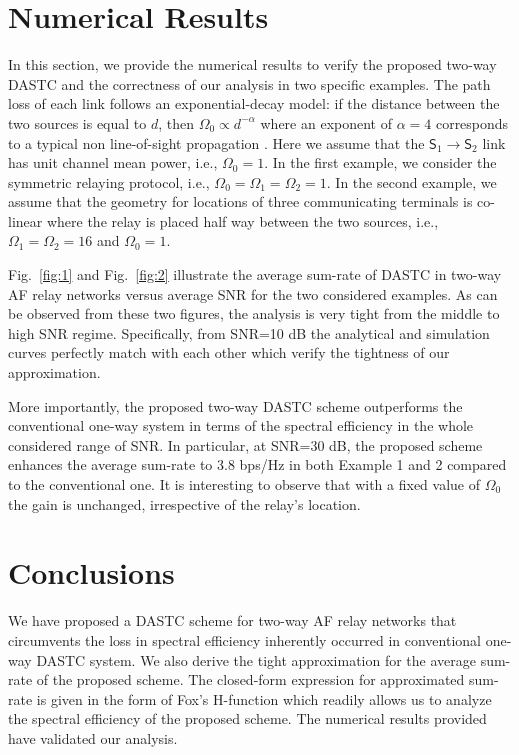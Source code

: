 \documentclass[conference]{IEEEtran}
\newcommand{\Source}[1]{\mathsf{S}_{#1}}
\newcommand{\CP}[1]{\Omega_{#1}}
\begin{document}
\section{Numerical Results} \label{sec:Result}

In this section, we provide the numerical results to verify the
proposed two-way DASTC and the correctness of our analysis in two
specific examples. The path loss of each link follows an
exponential-decay model: if the distance between the two sources is
equal to $d$, then $\CP{0} \propto d^{-\alpha}$ where an exponent of
$\alpha=4$ corresponds to a typical non line-of-sight propagation
\cite{HTHC:08:VTCSpring}. Here we assume that the
$\Source{1}\longrightarrow \Source{2}$ link has unit channel mean
power, i.e., $\CP{0}=1$. In the first example, we consider the
symmetric relaying protocol, i.e., $\CP{0}=\CP{1}=\CP{2}=1$. In the
second example, we assume that the geometry for locations of three
communicating terminals is co-linear where the relay is placed half
way between the two sources, i.e., $\CP{1}=\CP{2}=16$ and
$\CP{0}=1$.

Fig.~\ref{fig:1} and Fig.~\ref{fig:2} illustrate the average
sum-rate of DASTC in two-way AF relay networks versus average SNR
for the two considered examples. As can be observed from these two
figures, the analysis is very tight from the middle to high SNR
regime. Specifically, from SNR=10 dB the analytical and simulation
curves perfectly match with each other which verify the tightness of
our approximation.

More importantly, the proposed two-way DASTC scheme outperforms the
conventional one-way system in terms of the spectral efficiency in
the whole considered range of SNR. In particular, at SNR=30 dB, the
proposed scheme enhances the average sum-rate to 3.8 bps/Hz in both
Example 1 and 2 compared to the conventional one. It is interesting
to observe that with a fixed value of $\CP{0}$ the gain is
unchanged, irrespective of the relay's location.
%
\section{Conclusions} \label{sec:Conclusions}

We have proposed a DASTC scheme for two-way AF relay networks that
circumvents the loss in spectral efficiency inherently occurred in
conventional one-way DASTC system. We also derive the tight
approximation for the average sum-rate of the proposed scheme. The
closed-form expression for approximated sum-rate is given in the
form of Fox's H-function which readily allows us to analyze the
spectral efficiency of the proposed scheme. The numerical results
provided have validated our analysis.
\end{document}
